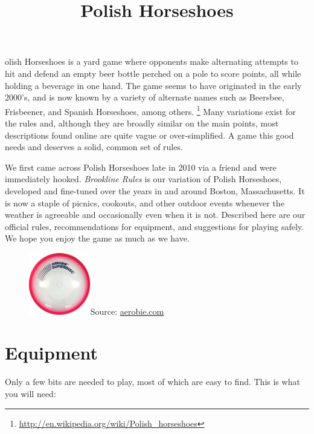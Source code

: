 \documentclass[11pt,letterpaper,twocolumn,english,DIV=calc]{scrartcl}
\title{\textsf{Polish Horseshoes}} %
\author{}
\date{} %
\newcommand{\initial}[1]{ %
	\lettrine[lines=2, lhang=0.35, nindent=0.1em, loversize=0.25]{
		\color{DarkRed}{\textsf{#1}}}{}}
\begin{document}
\maketitle

\thispagestyle{headings}

\initial{P}olish Horseshoes is a yard game where opponents make alternating attempts to hit and defend an empty beer bottle perched on a pole to score points, all while holding a beverage in one hand.
The game seems to have originated in the early 2000's, and is now known by a variety of alternate names such as Beersbee, Frisbeener, and Spanish Horseshoes, among others.%
\footnote{\url{http://en.wikipedia.org/wiki/Polish_horseshoes}}
Many variations exist for the rules and, although they are broadly similar on the main points, most descriptions found online are quite vague or over-simplified. 
A game this good needs and deserves a solid, common set of rules.

We first came across Polish Horseshoes late in 2010 via a friend and were immediately hooked. 
\emph{Brookline Rules} is our variation of Polish Horseshoes, developed and fine-tuned over the years in and around Boston, Massachusetts. 
It is now a staple of picnics, cookouts, and other outdoor events whenever the weather is agreeable and occasionally even when it is not. 
Described here are our official rules, recommendations for equipment, and suggestions for playing safely. 
We hope you enjoy the game as much as we have.

\begin{figure}[H]
	\centering{}
	\includegraphics[width=0.24\textwidth]{images/superdisc}{\footnotesize{}Source:
	\href{http://www.aerobie.com}{aerobie.com}}
\end{figure}


\part*{Equipment}

Only a few bits are needed to play, most of which are easy to find.
This is what you will need:
\end{document}
